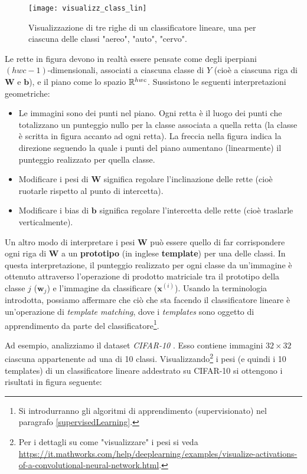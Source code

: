 \begin{figure}[h]
\centering
\texttt{[image: visualizz\_class\_lin]}
\caption{Visualizzazione di tre righe di un classificatore lineare, una per ciascuna delle classi "aereo", "auto", "cervo".}
\label{visual_class_lin}
\end{figure}

Le rette in figura devono in realtà essere pensate come degli iperpiani $(hwc-1)$-dimensionali, associati a ciascuna classe di $Y$ (cioè a ciascuna riga di $\mathbf{W}$ e $\mathbf{b}$), e il piano come lo spazio $\mathbb{R}^{hwc}$. Sussistono le seguenti interpretazioni geometriche:
\begin{itemize}
\item Le immagini sono dei punti nel piano. Ogni retta è il luogo dei punti che totalizzano un punteggio nullo per la classe associata a quella retta (la classe è scritta in figura accanto ad ogni retta). La freccia nella figura indica la direzione seguendo la quale i punti del piano aumentano (linearmente) il punteggio realizzato per quella classe.
\item Modificare i pesi di $\mathbf{W}$ significa regolare l'inclinazione delle rette (cioè ruotarle rispetto al punto di intercetta).
\item Modificare i bias di $\mathbf{b}$ significa regolare l'intercetta delle rette (cioè traslarle verticalmente).
\end{itemize}

Un altro modo di interpretare i pesi $\mathbf{W}$ può essere quello di far corrispondere ogni riga di $\mathbf{W}$ a un \textbf{prototipo} (in inglese \textbf{template}) per una delle classi. In questa interpretazione, il punteggio realizzato per ogni classe da un'immagine è ottenuto attraverso l'operazione di prodotto matriciale tra il prototipo della classe $j$ ($\mathbf{w}_j$) e l'immagine da classificare ($\mathbf{x}^{(i)}$).
Usando la terminologia introdotta, possiamo affermare che ciò che sta facendo il classificatore lineare è un'operazione di \textit{template matching}, dove i \textit{templates} sono oggetto di apprendimento da parte del classificatore\footnote{Si introdurranno gli algoritmi di apprendimento (supervisionato) nel paragrafo \ref{supervisedLearning}.}.

Ad esempio, analizziamo il dataset \textit{CIFAR-10} \cite{cifar10}. Esso contiene immagini $32\times 32$ ciascuna appartenente ad una di 10 classi. Visualizzando\footnote{Per i dettagli su come "visualizzare" i pesi si veda \url{https://it.mathworks.com/help/deeplearning/examples/visualize-activations-of-a-convolutional-neural-network.html}.} i pesi (e quindi i 10 templates) di un classificatore lineare addestrato su CIFAR-10 si ottengono i risultati in figura seguente:

